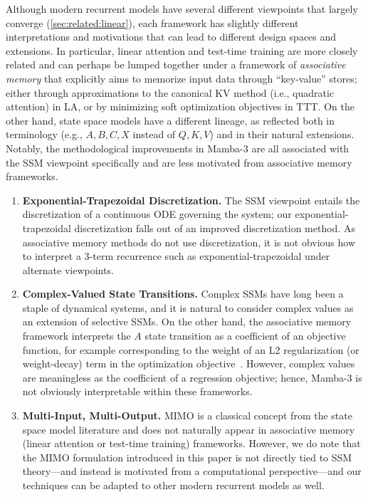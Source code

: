 \documentclass{article}
\newcommand{\citep}{\parencite}
\theoremstyle{plain}
\theoremstyle{definition}
\theoremstyle{remark}
\begin{document}
Although modern recurrent models have several different viewpoints that largely converge (\cref{sec:related:linear}),
each framework has slightly different interpretations and motivations that can lead to different design spaces and extensions.
In particular, linear attention and test-time training are more closely related and can perhaps be lumped together under a framework of \emph{associative memory} that explicitly aims to memorize input data through ``key-value'' stores;
either through approximations to the canonical KV method (i.e., quadratic attention) in LA,
or by minimizing soft optimization objectives in TTT.
On the other hand, state space models have a different lineage, as reflected both in terminology (e.g., $A,B,C,X$ instead of $Q,K,V$) and in their natural extensions.
Notably, the methodological improvements in Mamba-3 are all associated with the SSM viewpoint specifically and are less motivated from associative memory frameworks.

\begin{enumerate}
    \item \textbf{Exponential-Trapezoidal Discretization.}
    The SSM viewpoint entails the discretization of a continuous ODE governing the system;
    our exponential-trapezoidal discretization falls out of an improved discretization method.
    As associative memory methods do not use discretization, it is not obvious how to interpret a 3-term recurrence such as exponential-trapezoidal under alternate viewpoints.
    \item \textbf{Complex-Valued State Transitions.}
    Complex SSMs have long been a staple of dynamical systems, and it is natural to consider complex values as an extension of selective SSMs.
    On the other hand, the associative memory framework interprets the $A$ state transition as a coefficient of an objective function, for example corresponding to the weight of an L2 regularization (or weight-decay) term in the optimization objective~\citep{wang2025testtimeregressionunifyingframework}.
    However, complex values are meaningless as the coefficient of a regression objective;
    hence, Mamba-3 is not obviously interpretable within these frameworks.
    \item \textbf{Multi-Input, Multi-Output.}
    MIMO is a classical concept from the state space model literature and does not naturally appear in associative memory (linear attention or test-time training) frameworks.
    However, we do note that the MIMO formulation introduced in this paper is not directly tied to SSM theory---and instead is motivated from a computational perspective---and our techniques can be adapted to other modern recurrent models as well.
\end{enumerate}
\end{document}
